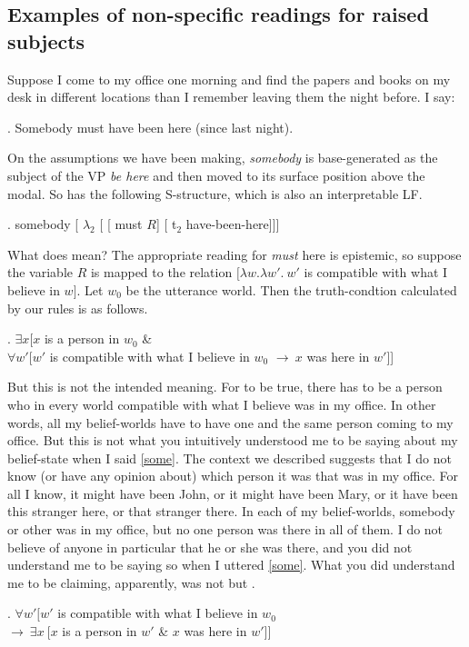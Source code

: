 \subsection{Examples of non-specific readings for raised subjects}

Suppose I come to my office one morning and find the papers and books on my desk in different locations than I remember leaving them the night before. I say:

\ex. \label{some} Somebody must have been here (since last night).

On the assumptions we have been making, \emph{somebody} is base-generated as the subject of the VP \emph{be here} and then moved to its surface position above the modal. So \Last has the following S-structure, which is also an interpretable LF.

\exi. \label{dere} somebody [ $\lambda_2$ [ [ must $R$] [ t$_2$ have-been-here]]]

What does \Last mean? The appropriate reading for \emph{must} here is epistemic, so suppose the variable $R$ is mapped to the relation $\bigl[\lambda w.\lambda w'.\ w'$ is compatible with what I believe in $w\bigr]$. Let $w_{0}$ be the utterance world. Then the truth-condtion calculated by our rules is as follows.

\ex. $\exists x [x$ is a person in $w_{0}$ \& \\
$\forall w'[w'$ is compatible with what I believe in $w_{0}$ $\rightarrow\ x$ was here in $w'$]]

But this is not the intended meaning. For \Last to be true, there has to be a person who in every world compatible with what I believe was in my office. In other words, all my belief-worlds have to have one and the same person coming to my office. But this is not what you intuitively understood me to be saying about my belief-state when I said \ref{some}. The context we described suggests that I do not know (or have any opinion about) which person it was that was in my office. For all I know, it might have been John, or it might have been Mary, or it have been this stranger here, or that stranger there. In each of my belief-worlds, somebody or other was in my office, but no one person was there in all of them. I do not believe of anyone in particular that he or she was there, and you did not understand me to be saying so when I uttered \ref{some}. What you did understand me to be claiming, apparently, was not \Last but \Next.

\ex. \label{dedic} $\forall w' [ w'$ is compatible with what I believe in $w_{0}$\\
\null\hfill$\rightarrow\ \exists x\ [x$ is a person in $w'$ \& $x$ was here in $w']]$

